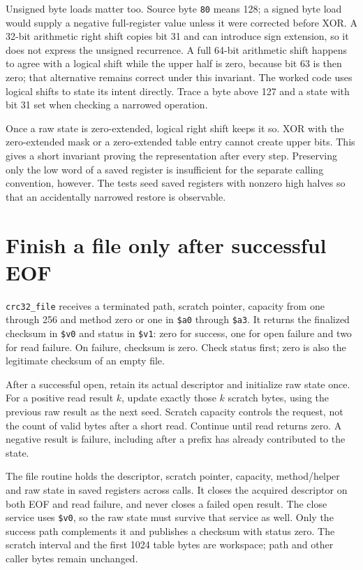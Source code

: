 Unsigned byte loads matter too. Source byte \texttt{80} means 128; a signed byte
load would supply a negative full-register value unless it were corrected before
XOR. A 32-bit arithmetic right shift copies bit 31 and can introduce sign
extension, so it does not express the unsigned recurrence. A full 64-bit arithmetic
shift happens to agree with a logical shift while the upper half is zero, because
bit 63 is then zero; that alternative remains correct under this invariant.
The worked code uses logical shifts to state its intent directly. Trace a byte
above 127 and a state with bit 31 set when checking a narrowed operation.

Once a raw state is zero-extended, logical right shift keeps it so. XOR with the
zero-extended mask or a zero-extended table entry cannot create upper bits.
This gives a short invariant proving the representation after every step.
Preserving only the low word of a saved register is insufficient for the separate
calling convention, however. The tests seed saved registers with nonzero high
halves so that an accidentally narrowed restore is observable.

\section{Finish a file only after successful EOF}

\texttt{crc32\_file} receives a terminated path, scratch pointer, capacity from
one through 256 and method zero or one in \texttt{\$a0} through \texttt{\$a3}.
It returns the finalized checksum in \texttt{\$v0} and status in
\texttt{\$v1}: zero for success, one for open failure and two for read failure.
On failure, checksum is zero. Check status first; zero is also the legitimate
checksum of an empty file.

After a successful open, retain its actual descriptor and initialize raw state
once. For a positive read result $k$, update exactly those $k$ scratch bytes,
using the previous raw result as the next seed. Scratch capacity controls the
request, not the count of valid bytes after a short read. Continue until read
returns zero. A negative result is failure, including after a prefix has already
contributed to the state.

The file routine holds the descriptor, scratch pointer, capacity, method/helper
and raw state in saved registers across calls. It closes the acquired descriptor
on both EOF and read failure, and never closes a failed open result. The close
service uses \texttt{\$v0}, so the raw state must survive that service as well.
Only the success path complements it and publishes a checksum with status zero.
The scratch interval and the first 1024 table bytes are workspace; path and other
caller bytes remain unchanged.

